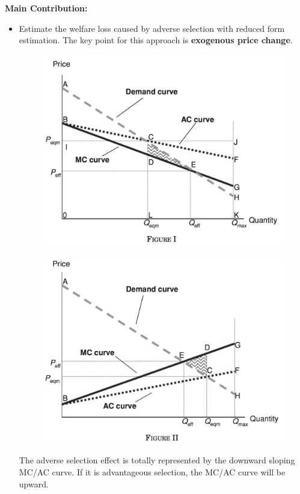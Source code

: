 \documentclass{book}
\theoremstyle{plain}
\theoremstyle{definition}
\begin{document}
\vspace{1em}
\noindent
\textbf{Main Contribution:}
\begin{itemize}
	\item Estimate the welfare loss caused by adverse selection with reduced form estimation. The key point for this approach is \textbf{exogenous price change}.
	\begin{figure}[h]
	\centering
	\includegraphics[scale=0.4]{EFC_10qje_1.png}
	\end{figure}

	\begin{figure}[h]
	\centering
	\includegraphics[scale=0.4]{EFC_10qje_2.png}
	\end{figure}

	The adverse selection effect is totally represented by the downward sloping MC/AC curve. If it is advantageous selection, the MC/AC curve will be upward. 
\end{itemize}
\end{document}
